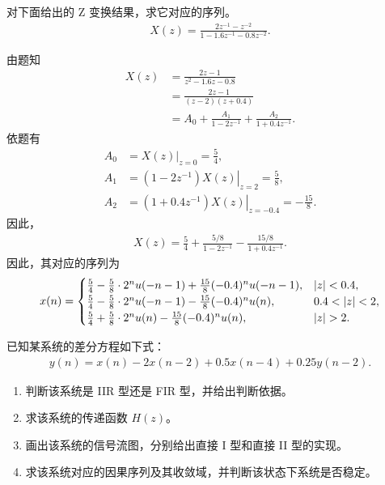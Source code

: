 \begin{exercise}
    对下面给出的 Z 变换结果，求它对应的序列。
    \begin{align*}
        X(z) = \frac{2z^{-1} - z^{-2}}{1 - 1.6z^{-1} - 0.8z^{-2}}.
    \end{align*}
\end{exercise}

\begin{solution}
    由题知
    \begin{align*}
        X(z) & = \frac{2z - 1}{z^2 - 1.6z - 0.8} \\
        & = \frac{2z - 1}{(z - 2)(z + 0.4)} \\
        & = A_0 + \frac{A_1}{1 - 2z^{-1}} + \frac{A_2}{1 + 0.4z^{-1}}.
    \end{align*}
    依题有
    \begin{align*}
        A_0 & = \left.X(z)\right|_{z = 0} = \frac{5}{4}, \\
        A_1 & = \left.(1 - 2z^{-1})X(z)\right|_{z = 2} = \frac{5}{8}, \\
        A_2 & = \left.(1 + 0.4z^{-1})X(z)\right|_{z = -0.4} = -\frac{15}{8}.
    \end{align*}
    因此，
    \begin{align*}
        X(z) = \frac{5}{4} + \frac{5/8}{1 - 2z^{-1}} - \frac{15/8}{1 + 0.4z^{-1}}.
    \end{align*}
    因此，其对应的序列为
    \begin{align*}
        x(n) = \begin{cases}
            \frac{5}{4} - \frac{5}{8}\cdot2^n u(-n - 1) + \frac{15}{8}(-0.4)^n u(-n - 1), & \left|z\right| < 0.4, \\
            \frac{5}{4} - \frac{5}{8}\cdot2^n u(-n - 1) - \frac{15}{8}(-0.4)^n u(n), & 0.4 < \left|z\right| < 2, \\
            \frac{5}{4} + \frac{5}{8}\cdot2^n u(n) - \frac{15}{8}(-0.4)^n u(n), & \left|z\right| > 2.
        \end{cases}
    \end{align*}
\end{solution}

\begin{exercise}
    已知某系统的差分方程如下式：
    \begin{align*}
        y(n) = x(n) - 2x(n - 2) + 0.5x(n - 4) + 0.25y(n - 2).
    \end{align*}
    \begin{enumerate}[label=(\arabic*)]
        \item 判断该系统是 IIR 型还是 FIR 型，并给出判断依据。
        \item 求该系统的传递函数 $H(z)$。
        \item 画出该系统的信号流图，分别给出直接 I 型和直接 II 型的实现。
        \item 求该系统对应的因果序列及其收敛域，并判断该状态下系统是否稳定。
    \end{enumerate}
\end{exercise}

